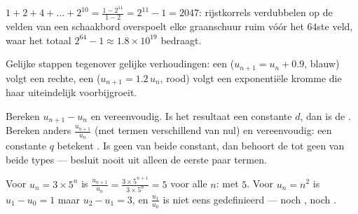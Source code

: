 \begin{example}\label{ex:g11:seq:chessboard}
$1 + 2 + 4 + \dots + 2^{10} = \frac{1 - 2^{11}}{1 - 2} = 2^{11} - 1 =
2047$: rijstkorrels verdubbelen op de velden van een schaakbord overspoelt
elke graanschuur ruim vóór het $64$ste veld, waar het totaal
$2^{64} - 1 \approx 1.8 \times 10^{19}$ bedraagt.
\end{example}

\begin{omfigure}

{\small Gelijke stappen tegenover gelijke verhoudingen: een 
($u_{n+1} = u_n + 0.9$, blauw) volgt een rechte, een 
($u_{n+1} = 1.2\,u_n$, rood) volgt een exponentiële kromme die haar
uiteindelijk voorbijgroeit.}
\end{omfigure}

\begin{method}\label{met:g11:seq:recognize}
Bereken $u_{n+1} - u_n$ en vereenvoudig. Is het resultaat een constante $d$,
dan is de  . Bereken anders $\frac{u_{n+1}}{u_n}$ (met termen
verschillend van nul) en vereenvoudig: een constante $q$ betekent
. Is geen van beide constant, dan behoort de  tot geen van beide
types --- besluit nooit uit alleen de eerste paar termen.
\end{method}

\begin{example}
Voor $u_n = 3 \times 5^n$ is
$\frac{u_{n+1}}{u_n} = \frac{3 \times 5^{n+1}}{3 \times 5^n} = 5$ voor alle
$n$:  met  $5$. Voor $u_n = n^2$ is $u_1 - u_0 = 1$ maar
$u_2 - u_1 = 3$, en $\frac{u_1}{u_0}$ is niet eens gedefinieerd --- noch
, noch .
\end{example}

